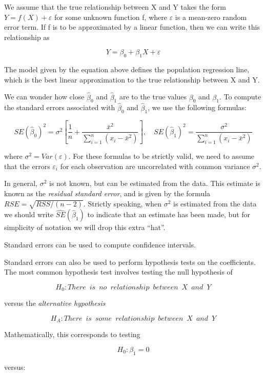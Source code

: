 \documentclass{article}
\theoremstyle{definition}
\theoremstyle{remark}
\begin{document}
	We assume that the true relationship between X and Y takes the form $Y=f(X)+\varepsilon$ for some unknown function f, where $\varepsilon$ is a mean-zero random error term. If f is to be approximated by a linear function, then we can write this relationship as
	
	\[
	Y=\beta_0+\beta_1X+\varepsilon
	\]
	
	The model given by the equation above defines the population regression line, which is the best linear approximation to the true relationship between X and Y.
	
	We can wonder how close $\hat{\beta}_0$ and $\hat{\beta}_1$ are to the true values $\beta_0$ and $\beta_1$. To compute the standard errors associated with $\hat{\beta}_0$ and $\hat{\beta}_1$, we use the following formulas:
	
	\[
	SE(\hat{\beta}_0)^2=	\sigma^2[\frac{1}{n}+\frac{\bar{x}^2}{\sum^n_{i=1}(x_i-\bar{x}^2)}],\quad SE(\hat{\beta}_1)^2=\frac{\sigma^2}{\sum^n_{i=1}(x_i-\bar{x}^2)}
	\]
	
	where $\sigma^2=Var(\varepsilon)$. For these formulas to be strictly valid, we need to assume that the errors $\varepsilon_i$ for each observation are uncorrelated with common variance $\sigma^2$.
	
	In general, $\sigma^2$ is not known, but can be estimated from the data. This estimate is known as the \textit{residual standard error}, and is given by the formula $RSE = \sqrt{RSS/(n-2)}$. Strictly speaking, when $\sigma^2$ is estimated from the data we should write $\hat{SE}(\hat{\beta}_1)$ to indicate that an estimate has been made, but for simplicity of notation we will drop this extra “hat”.
	
	Standard errors can be used to compute confidence intervals.
	
	Standard errors can also be used to perform hypothesis tests on the coefficients. The most common hypothesis test involves testing the null hypothesis of
	
	\[
	H_0: There\enspace is\enspace no\enspace relationship\enspace between\enspace X\enspace and\enspace Y
	\]

	versus the \textit{alternative hypothesis}
	
	\[
	H_A: There\enspace is\enspace some\enspace relationship\enspace between\enspace X\enspace and\enspace Y
	\]
	
	Mathematically, this corresponds to testing
	
	\[
	H_0: \beta_1=0
	\]
	
	versus:
	
\end{document}
